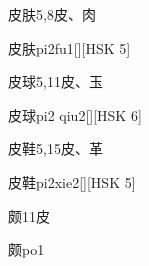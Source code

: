\begin{entry}{皮肤}{5,8}{⽪、⾁}
  \begin{phonetics}{皮肤}{pi2fu1}[][HSK 5]
  \end{phonetics}
\end{entry}

\begin{entry}{皮球}{5,11}{⽪、⽟}
  \begin{phonetics}{皮球}{pi2 qiu2}[][HSK 6]
  \end{phonetics}
\end{entry}

\begin{entry}{皮鞋}{5,15}{⽪、⾰}
  \begin{phonetics}{皮鞋}{pi2xie2}[][HSK 5]
  \end{phonetics}
\end{entry}

\begin{entry}{颇}{11}{⽪}
  \begin{phonetics}{颇}{po1}
  \end{phonetics}
\end{entry}


